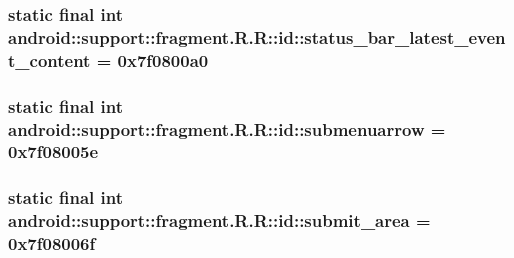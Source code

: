 \hypertarget{classandroid_1_1support_1_1fragment_1_1_r_1_1id_c0fb64cf32b9f1c7f5e8600966b30e1c}{
\subsubsection[{status\_\-bar\_\-latest\_\-event\_\-content}]{\setlength{\rightskip}{0pt plus 5cm}static final int android::support::fragment.R.R::id::status\_\-bar\_\-latest\_\-event\_\-content = 0x7f0800a0}}
\label{classandroid_1_1support_1_1fragment_1_1_r_1_1id_c0fb64cf32b9f1c7f5e8600966b30e1c}


\hypertarget{classandroid_1_1support_1_1fragment_1_1_r_1_1id_c78716cec9696ac45c8d1e56c2d60124}{
\subsubsection[{submenuarrow}]{\setlength{\rightskip}{0pt plus 5cm}static final int android::support::fragment.R.R::id::submenuarrow = 0x7f08005e}}
\label{classandroid_1_1support_1_1fragment_1_1_r_1_1id_c78716cec9696ac45c8d1e56c2d60124}


\hypertarget{classandroid_1_1support_1_1fragment_1_1_r_1_1id_c666696e554fd95a7896c91a315c6ecd}{
\subsubsection[{submit\_\-area}]{\setlength{\rightskip}{0pt plus 5cm}static final int android::support::fragment.R.R::id::submit\_\-area = 0x7f08006f}}
\label{classandroid_1_1support_1_1fragment_1_1_r_1_1id_c666696e554fd95a7896c91a315c6ecd}


